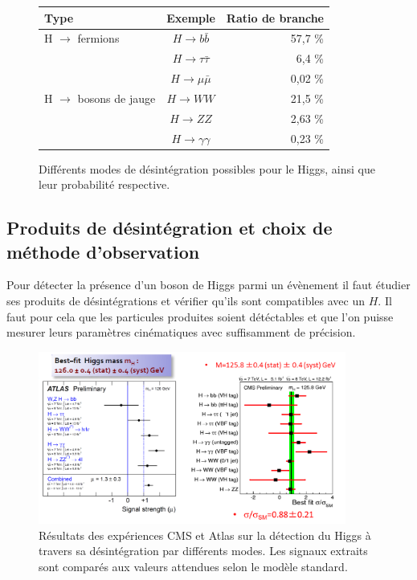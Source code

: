 \documentclass[11pt]{article} %
\begin{document}
\begin{figure}[H]
\centering
\begin{tabular}{|l|c|r|} 
   \hline
   Type & Exemple & Ratio de branche\\
    \hline
    H $\to$ fermions & $H \to b\bar{b} $ & 57,7 \% \\
    \cline{2-3} 
        & $H \to \tau\bar{\tau} $ & 6,4 \% \\
   \cline{2-3} 
        & $H \to \mu\bar{\mu}$ & 0,02 \%\\
    \hline
  H $\to$ bosons de jauge & $H \to WW$ &21,5 \% \\
   \cline{2-3}
     & $H \to ZZ$ & 2,63 \% \\
   \cline{2-3}
      & $H \to \gamma \gamma$ & 0,23 \% \\
  \hline
\end{tabular}
\caption{Différents modes de désintégration possibles pour le Higgs, ainsi que leur probabilité respective. }
\end{figure}

\subsection{Produits de désintégration et choix de méthode d'observation}

Pour détecter la présence d'un boson de Higgs parmi un évènement il faut étudier ses produits de désintégrations et vérifier qu'ils sont compatibles avec un $H$. Il faut pour cela que les particules produites soient détéctables et que l'on puisse mesurer leurs paramètres cinématiques avec suffisamment de précision.

\begin{figure}[H]
\centering
  \caption{Résultats des expériences CMS et Atlas sur la détection du Higgs à travers sa désintégration par différents modes. Les signaux extraits sont comparés aux valeurs attendues selon le modèle standard. }
 \includegraphics[width=0.9\textwidth]{../images/hcp_atlas_cms_higgs.png}
\end{figure}
\end{document}
